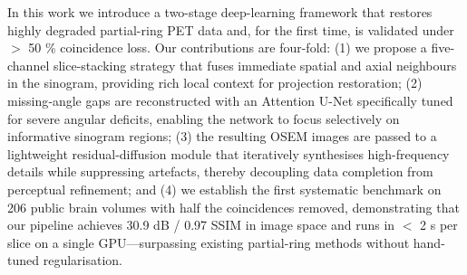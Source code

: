 \documentclass[12pt]{iopart}
\begin{document}




In this work we introduce a two-stage deep-learning framework that restores highly degraded partial-ring PET data and, for the first time, is validated under $>$ 50 \% coincidence loss.  Our contributions are four-fold: 
(1) we propose a five-channel slice-stacking strategy that fuses immediate spatial and axial neighbours in the sinogram, providing rich local context for projection restoration; 
(2) missing‐angle gaps are reconstructed with an Attention U-Net specifically tuned for severe angular deficits, enabling the network to focus selectively on informative sinogram regions; 
(3) the resulting OSEM images are passed to a lightweight residual-diffusion module that iteratively synthesises high-frequency details while suppressing artefacts, thereby decoupling data completion from perceptual refinement; 
and (4) we establish the first systematic benchmark on 206 public brain volumes with half the coincidences removed, demonstrating that our pipeline achieves 30.9 dB / 0.97 SSIM in image space and runs in $<$ 2 s per slice on a single GPU—surpassing existing partial-ring methods without hand-tuned regularisation.
\end{document}
